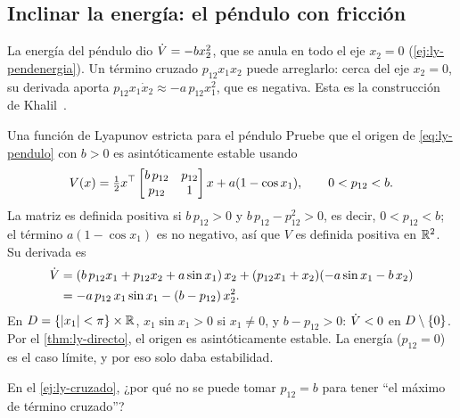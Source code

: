 
\subsection{Inclinar la energía: el péndulo con fricción}

La energía del péndulo dio $\dot V=-bx_2^2$, que se anula en todo el eje $x_2=0$ (\cref{ej:ly-pendenergia}). Un término cruzado $p_{12}x_1x_2$ puede arreglarlo: cerca del eje $x_2=0$, su derivada aporta $p_{12}x_1\dot x_2\approx-a\,p_{12}x_1^2$, que es negativa. Esta es la construcción de Khalil~\citep[ej.~4.4]{Kha02}.

\begin{ejemplo}[label=ej:ly-cruzado]{Una función de Lyapunov estricta para el péndulo}
Pruebe que el origen de \eqref{eq:ly-pendulo} con $b>0$ es asintóticamente estable usando
\begin{equation}
  V(x)=\tfrac12x^{\top}\begin{bmatrix}b\,p_{12}&p_{12}\\p_{12}&1\end{bmatrix}x+a(1-\cos x_1),\qquad 0<p_{12}<b .
  \label{eq:ly-Vcruzado}
\end{equation}
\solucion La matriz es definida positiva si $b\,p_{12}>0$ y $b\,p_{12}-p_{12}^2>0$, es decir, $0<p_{12}<b$; el término $a(1-\cos x_1)$ es no negativo, así que $V$ es definida positiva en $\mathbb{R}^2$. Su derivada es
\begin{align*}
  \dot V&=(b\,p_{12}x_1+p_{12}x_2+a\sin x_1)\,x_2+(p_{12}x_1+x_2)(-a\sin x_1-b\,x_2)\\
  &=-a\,p_{12}\,x_1\sin x_1-(b-p_{12})\,x_2^2 .
\end{align*}
En $D=\{\left\lvert x_1\right\rvert<\pi\}\times\mathbb{R}$, $x_1\sin x_1>0$ si $x_1\neq0$, y $b-p_{12}>0$: $\dot V<0$ en $D\setminus\{0\}$. Por el \cref{thm:ly-directo}, el origen es asintóticamente estable. La energía ($p_{12}=0$) es el caso límite, y por eso solo daba estabilidad.
\end{ejemplo}


\begin{pausa}
En el \cref{ej:ly-cruzado}, ¿por qué no se puede tomar $p_{12}=b$ para tener ``el máximo de término cruzado''?
\end{pausa}

